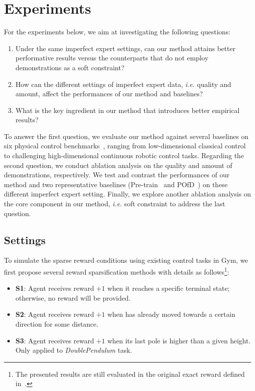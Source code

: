 \documentclass[letterpaper]{article} %
\begin{document}
\section{Experiments}\label{sec:exp}
For the experiments below, we aim at investigating the following questions:
\begin{enumerate}
    \item Under the same imperfect expert settings, can our method attains better performative results versus the counterparts that do not employ demonstrations as a soft constraint?
    \item How can the different settings of imperfect expert data, \emph{i.e.} quality and amount, affect the performances of our method and baselines?
    \item What is the key ingredient in our method that introduces better empirical results?
\end{enumerate}
To answer the first question, we evaluate our method against several baselines on six physical control benchmarks~\cite{benchmark,gym}, ranging from low-dimensional classical control to challenging high-dimensional continuous robotic control tasks. Regarding the second question, we conduct ablation analysis on the quality and amount of demonstrations, respectively. We test and contrast the performances of our method and two representative baselines (Pre-train~\cite{pretrain1} and POfD~\cite{pofd}) on these different imperfect expert setting. Finally, we explore another ablation analysis on the core component in our method, \emph{i.e.} soft constraint to address the last question.

\subsection{Settings}
To simulate the sparse reward conditions using existing control tasks in Gym, we first propose several reward sparsification methods with details as follows\footnote{The presented results are still evaluated in the original exact reward defined in~\cite{gym}.}:
\begin{itemize}
    \item \textbf{S1}: Agent receives reward $+1$ when it reaches a specific terminal state; otherwise, no reward will be provided.
    \item \textbf{S2}: Agent receives reward $+1$ when has already moved towards a certain direction for some distance.
    \item \textbf{S3}: Agent receives reward $+1$ when its last pole is higher than a given height. Only applied to \textit{DoublePendulum} task.
\end{itemize}
\end{document}
